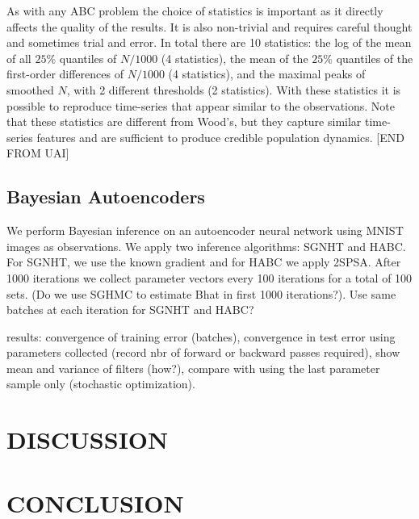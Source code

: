 \documentclass[]{article}
\begin{document}
As with any ABC problem the choice of statistics is important as it directly affects the quality of the results.   It is also non-trivial and requires careful thought and sometimes trial and error.   In total there are 10 statistics: the log of the mean of all $25\%$ quantiles of $N/1000$ (4 statistics), the mean of the $25\%$ quantiles of the first-order differences of $N/1000$ (4 statistics), and the maximal peaks of smoothed $N$, with 2 different thresholds (2 statistics).    With these statistics it is possible to reproduce time-series that appear similar to the observations.  Note that these statistics are different from Wood's, but they capture similar time-series features and are sufficient to produce credible population dynamics. [END FROM UAI]


\subsection{Bayesian Autoencoders}
We perform Bayesian inference on an autoencoder neural network using MNIST images as observations.  We apply two inference algorithms: SGNHT and HABC.  For SGNHT, we use the known gradient and for HABC we apply 2SPSA.  After 1000 iterations we collect parameter vectors every 100 iterations for a total of 100 sets. (Do we use SGHMC to estimate Bhat in first 1000 iterations?).  Use same batches at each iteration for SGNHT and HABC? 

results: convergence of training error (batches), convergence in test error using parameters collected (record nbr of forward or backward passes required), show mean and variance of filters (how?), compare with using the last parameter sample only (stochastic optimization).





\section{DISCUSSION} \label{discussion}


\section{CONCLUSION} \label{conclusion}
\end{document}
